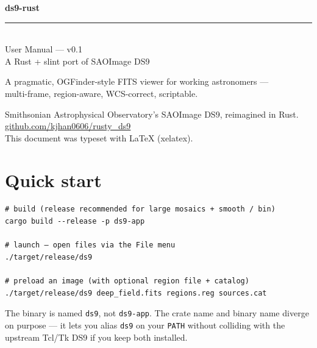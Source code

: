 \documentclass[11pt,a4paper]{article}
\title{}
\author{}
\date{}
\begin{document}
\pagecolor{paper}
\color{ink}

\begin{titlepage}
\centering
\vspace*{4cm}
{\sffamily\Huge\bfseries\color{accent} ds9-rust}\\[6pt]
{\color{accentSoft}\rule{0.45\textwidth}{0.6pt}}\\[14pt]
{\sffamily\Large User Manual --- v0.1}\\[4pt]
{\sffamily\large\color{accentSoft} A Rust + slint port of SAOImage DS9}\\[28pt]
\begin{tcolorbox}[width=0.7\textwidth,
                  colback=accent!5!paper,colframe=accent!40!paper,
                  halign=center, boxrule=0.4pt, arc=2pt]
\sffamily\small
A pragmatic, OGFinder-style FITS viewer for working astronomers ---\\
multi-frame, region-aware, WCS-correct, scriptable.
\end{tcolorbox}
\vfill
{\sffamily\small\color{accentSoft}
Smithsonian Astrophysical Observatory's SAOImage DS9, reimagined in Rust.\\
\href{https://github.com/kjhan0606/rusty_ds9}{github.com/kjhan0606/rusty\_ds9}\\[4pt]
This document was typeset with \LaTeX{} (xelatex).}
\end{titlepage}

\renewcommand{\contentsname}{\sffamily\Large\color{accent} Contents}
\tableofcontents
\thispagestyle{empty}
\clearpage

\section{Quick start}

\begin{lstlisting}[language=shell]
# build (release recommended for large mosaics + smooth / bin)
cargo build --release -p ds9-app

# launch — open files via the File menu
./target/release/ds9

# preload an image (with optional region file + catalog)
./target/release/ds9 deep_field.fits regions.reg sources.cat
\end{lstlisting}

\begin{noteb}
The binary is named \texttt{ds9}, not \texttt{ds9-app}. The crate name and
binary name diverge on purpose --- it lets you alias \texttt{ds9} on your
\texttt{PATH} without colliding with the upstream Tcl/Tk DS9 if you keep
both installed.
\end{noteb}
\end{document}
